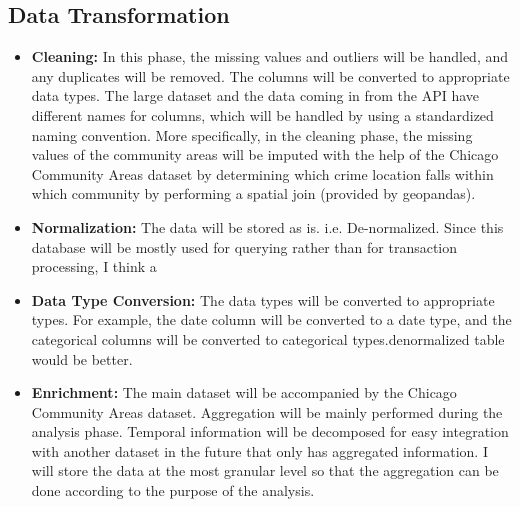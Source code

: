 \documentclass{article}
\begin{document}
\subsection{Data Transformation}
\begin{itemize}
    \item \textbf{Cleaning:} In this phase, the missing values and outliers will be handled, and any duplicates will be removed. The columns will be converted to appropriate data types. The large dataset and the data coming in from the API have different names for columns, which will be handled by using a standardized naming convention. More specifically, in the cleaning phase, the missing values of the community areas will be imputed with the help of the Chicago Community Areas dataset by determining which crime location falls within which community by performing a spatial join (provided by geopandas).
\item  \textbf{Normalization:} The data will be stored as is. i.e. De-normalized. Since this database will be mostly used for querying rather than for transaction processing,                                                                                                                                                                                                                                                                                                                                                                                                                                                                                                                              I think a 
    \item \textbf{Data Type Conversion:} The data types will be converted to appropriate types. For example, the date column will be converted to a date type, and the categorical columns will be converted to categorical types.denormalized table would be better.
    \item \textbf{Enrichment:} The main dataset will be accompanied by the Chicago Community Areas dataset. Aggregation will be mainly performed during the analysis phase. Temporal information will be decomposed for easy integration with another dataset in the future that only has aggregated information. I will store the data at the most granular level so that the aggregation can be done according to the purpose of the analysis.
\end{itemize}
\end{document}
